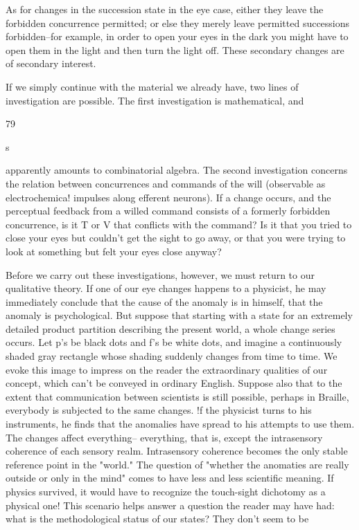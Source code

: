 \documentclass[10pt,twoside]{memoir}
\begin{document}
\begin{enumerate}
{{{{{{{{{{{{{{{{As for changes in the succession state in the eye case, either they leave 
the forbidden concurrence permitted; or else they merely leave permitted 
successions forbidden--for example, in order to open your eyes in the dark 
you might have to open them in the light and then turn the light off. These 
secondary changes are of secondary interest. 

If we simply continue with the material we already have, two lines of 
investigation are possible. The first investigation is mathematical, and 


79 


s 


apparently amounts to combinatorial algebra. The second investigation 
concerns the relation between concurrences and commands of the will 
(observable as electrochemica! impulses along efferent neurons). If a change 
occurs, and the perceptual feedback from a willed command consists of a 
formerly forbidden concurrence, is it T or V that conflicts with the 
command? Is it that you tried to close your eyes but couldn't get the sight 
to go away, or that you were trying to look at something but felt your eyes 
close anyway? 

Before we carry out these investigations, however, we must return to 
our qualitative theory. If one of our eye changes happens to a physicist, he 
may immediately conclude that the cause of the anomaly is in himself, that 
the anomaly is psychological. But suppose that starting with a state for an 
extremely detailed product partition describing the present world, a whole 
change series occurs. Let p's be black dots and f's be white dots, and imagine 
a continuously shaded gray rectangle whose shading suddenly changes from 
time to time. We evoke this image to impress on the reader the 
extraordinary qualities of our concept, which can't be conveyed in ordinary 
English. Suppose also that to the extent that communication between 
scientists is still possible, perhaps in Braille, everybody is subjected to the 
same changes. !f the physicist turns to his instruments, he finds that the 
anomalies have spread to his attempts to use them. The changes affect 
everything-- everything, that is, except the intrasensory coherence of each 
sensory realm. Intrasensory coherence becomes the only stable reference 
point in the "world." The question of "whether the anomaties are really 
outside or only in the mind" comes to have less and less scientific meaning. 
If physics survived, it would have to recognize the touch-sight dichotomy as 
a physical one! This scenario helps answer a question the reader may have 
had: what is the methodological status of our states? They don't seem to be 


}}}}}}}}}}}}}}}}
\end{enumerate}
\end{document}
